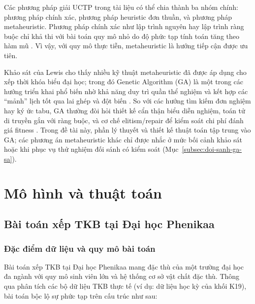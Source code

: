 \documentclass[a4paper,12pt,oneside]{article}
\begin{document}
	Các phương pháp giải UCTP trong tài liệu có thể chia thành ba nhóm chính: phương pháp chính xác, phương pháp heuristic đơn thuần, và phương pháp metaheuristic. Phương pháp chính xác như lập trình nguyên hay lập trình ràng buộc chỉ khả thi với bài toán quy mô nhỏ do độ phức tạp tính toán tăng theo hàm mũ \cite{schaerf1999survey}. Vì vậy, với quy mô thực tiễn, metaheuristic là hướng tiếp cận được ưu tiên.
	
	Khảo sát của Lewis cho thấy nhiều kỹ thuật metaheuristic đã được áp dụng cho xếp thời khóa biểu đại học; trong đó Genetic Algorithm (GA) là một trong các hướng triển khai phổ biến nhờ khả năng duy trì quần thể nghiệm và kết hợp các ``mảnh'' lịch tốt qua lai ghép và đột biến \cite{lewis2008survey,burke1997automated}. So với các hướng tìm kiếm đơn nghiệm hay ký ức tabu, GA thường đòi hỏi thiết kế cẩn thận biểu diễn nghiệm, toán tử di truyền gắn với ràng buộc, và cơ chế elitism/repair để kiểm soát chi phí đánh giá fitness \cite{goldberg1989genetic,eiben2015introduction}. Trong đề tài này, phần lý thuyết và thiết kế thuật toán tập trung vào GA; các phương án metaheuristic khác chỉ được nhắc ở mức bối cảnh khảo sát hoặc khi phục vụ thử nghiệm đối sánh có kiểm soát (Mục~\ref{subsec:doi-sanh-ga-sa}).
	
	\section{Mô hình và thuật toán}
	
	\subsection{Bài toán xếp TKB tại Đại học Phenikaa}
	
	\subsubsection{Đặc điểm dữ liệu và quy mô bài toán}
	
	Bài toán xếp TKB tại Đại học Phenikaa mang đặc thù của một trường đại học đa ngành với quy mô sinh viên lớn và hệ thống cơ sở vật chất đặc thù. Thông qua phân tích các bộ dữ liệu TKB thực tế (ví dụ: dữ liệu học kỳ của khối K19), bài toán bộc lộ sự phức tạp trên cấu trúc như sau:
	
\end{document}
